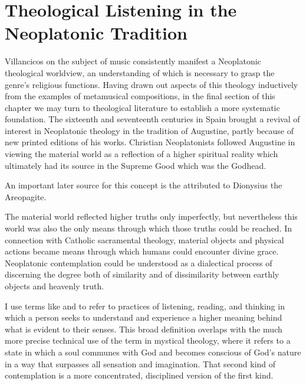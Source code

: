 \section{Theological Listening in the Neoplatonic Tradition}

Villancicos on the subject of music consistently manifest a Neoplatonic
theological worldview, an understanding of which is necessary to grasp the
genre's religious functions.
Having drawn out aspects of this theology inductively from the examples of
metamusical compositions, in the final section of this chapter we may turn to
theological literature to establish a more systematic foundation.
The sixteenth and seventeenth centuries in Spain brought a revival of interest
in Neoplatonic theology in the tradition of Augustine, partly because of new
printed editions of his works.%
    \Autocite{Weber:ReligiousLitSpain}
Christian Neoplatonists followed Augustine in viewing the material
world as a reflection of a higher spiritual reality which ultimately had its
source in the Supreme Good which was the Godhead.%
\begin{Footnote}
    An important later source for this concept is the  attributed to Dionysius the Areopagite.
\end{Footnote}
The material world reflected higher truths only imperfectly, but nevertheless
this world was also the only means through which those truths could be reached.
In connection with Catholic sacramental theology, material objects and physical
actions became means through which humans could encounter divine grace.
Neoplatonic contemplation could be understood as a dialectical process of
discerning the degree both of similarity and of dissimilarity between earthly
objects and heavenly truth.%
\begin{Footnote}
    I use terms like  and  to
    refer to practices of listening, reading, and thinking in which a person
    seeks to understand and experience a higher meaning behind what is evident
    to their senses. 
    This broad definition overlaps with the much more precise technical use of
    the term  in mystical theology, where it refers to
    a state in which a soul communes with God and becomes conscious of God's
    nature in a way that surpasses all sensation and imagination.
    That second kind of contemplation is a more concentrated, disciplined
    version of the first kind.
\end{Footnote}

